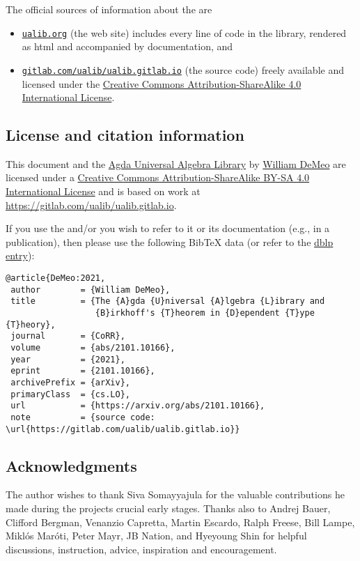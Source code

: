 \noindent The official sources of information about the \agdaualib are
\begin{itemize}
  \item \href{https://ualib.gitlab.io}{\texttt{ualib.org}} (the web site) includes every line of code in the library, rendered as html and accompanied by documentation, and
  \item \href{https://gitlab.com/ualib/ualib.gitlab.io}{\texttt{gitlab.com/ualib/ualib.gitlab.io}} (the source code) freely available and licensed under the \href{https://creativecommons.org/licenses/by-sa/4.0/}{Creative Commons Attribution-ShareAlike 4.0 International License}.
\end{itemize}


\subsection*{License and citation information}
This document and the \href{https://gitlab.com/ualib/ualib.gitlab.io/}{Agda Universal Algebra Library} by \href{mailto:williamdemeo@gmail.com}{William DeMeo} are licensed under a \href{http://creativecommons.org/licenses/by-sa/4.0/}{Creative Commons Attribution-ShareAlike BY-SA 4.0 International License} and is based on work at \url{https://gitlab.com/ualib/ualib.gitlab.io}.

If you use the \agdaualib and/or you wish to refer to it or its documentation (e.g., in a publication), then please use the following BibTeX data (or refer to the \href{https://dblp.uni-trier.de/rec/journals/corr/abs-2101-10166.html?view=bibtex}{dblp entry}):

{\small
\begin{verbatim}
@article{DeMeo:2021,
 author        = {William DeMeo},
 title         = {The {A}gda {U}niversal {A}lgebra {L}ibrary and 
                  {B}irkhoff's {T}heorem in {D}ependent {T}ype {T}heory}, 
 journal       = {CoRR},
 volume        = {abs/2101.10166},
 year          = {2021},
 eprint        = {2101.10166},
 archivePrefix = {arXiv},
 primaryClass  = {cs.LO},
 url           = {https://arxiv.org/abs/2101.10166},
 note          = {source code: \url{https://gitlab.com/ualib/ualib.gitlab.io}}
\end{verbatim}
}

\subsection*{Acknowledgments}
The author wishes to thank Siva Somayyajula for the valuable contributions he made during the projects crucial early stages. Thanks also to Andrej Bauer, Clifford Bergman, Venanzio Capretta, Martin Escardo, Ralph Freese, Bill Lampe, Miklós Maróti, Peter Mayr, JB Nation, and Hyeyoung Shin for helpful discussions, instruction, advice, inspiration
and encouragement.

